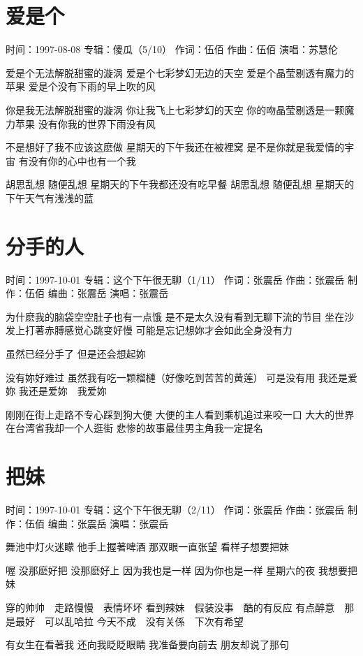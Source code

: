 \documentclass[UTF8,a4paper,oneside,twocolumn,12pt]{ctexbook}
\newcommand{\infopair}[2]{\textbullet #1：#2}
\newcommand{\zc}[1][伍佰]{\infopair{作词}{#1}}
\newcommand{\zq}[1][伍佰]{\infopair{作曲}{#1}}
\newcommand{\bq}[1][伍佰]{\infopair{编曲}{#1}}
\newcommand{\zj}[1]{\infopair{专辑}{#1}}
\newcommand{\zz}[1]{\infopair{制作}{#1}}
\newcommand{\sj}[1]{\infopair{时间}{#1}}
\newenvironment{info}{\begin{flushleft}\kaishu
	}
	{\end{flushleft}\normalsize\yahei\par}
\newenvironment{lyric}{
	}
{}
\begin{document}
\section{爱是个}
\begin{info}
	\sj{1997-08-08}
	\zj{傻瓜（5/10）}
	\zc
	\zq
	\infopair{演唱}{苏慧伦}
\end{info}
\begin{lyric}
	爱是个无法解脱甜蜜的漩涡
	爱是个七彩梦幻无边的天空
	爱是个晶莹剔透有魔力的苹果
	爱是个没有下雨的早上吹的风

	你是我无法解脱甜蜜的漩涡
	你让我飞上七彩梦幻的天空
	你的吻晶莹剔透是一颗魔力苹果
	没有你我的世界下雨没有风

	不是想好了我不应该这麽做
	星期天的下午我还在被裡窝
	是不是你就是我爱情的宇宙
	有没有你的心中也有一个我

	胡思乱想 随便乱想 星期天的下午我都还没有吃早餐
	胡思乱想 随便乱想 星期天的下午天气有浅浅的蓝
\end{lyric}

\section{分手的人}
\begin{info}
	\sj{1997-10-01}
	\zj{这个下午很无聊（1/11）}
	\zc[张震岳]
	\zq[张震岳]
	\zz{伍佰}
	\bq[张震岳]
	\infopair{演唱}{张震岳}
\end{info}
\begin{lyric}
	为什麽我的脑袋空空肚子也有一点饿
	是不是太久没有看到无聊下流的节目
	坐在沙发上打著赤膊感觉心跳变好慢
	可能是忘记想妳才会如此全身没有力

	虽然已经分手了 但是还会想起妳

	没有妳好难过
	虽然我有吃一颗榴槤（好像吃到苦苦的黄莲）
	可是没有用 我还是爱妳
	我还是爱妳　我爱妳

	刚刚在街上走路不专心踩到狗大便
	大便的主人看到乘机追过来咬一口
	大大的世界在台湾省我却一个人逛街
	悲惨的故事最佳男主角我一定提名
\end{lyric}

\section{把妹}
\begin{info}
	\sj{1997-10-01}
	\zj{这个下午很无聊（2/11）}
	\zc[张震岳]
	\zq[张震岳]
	\zz{伍佰}
	\bq[张震岳]
	\infopair{演唱}{张震岳}
\end{info}
\begin{lyric}
	舞池中灯火迷矇 他手上握著啤酒
	那双眼一直张望 看样子想要把妹

	喔 没那麽好把 没那麽好上
	因为我也是一样 因为你也是一样
	星期六的夜 我想要把妹

	穿的帅帅　走路慢慢　表情坏坏
	看到辣妹　假装没事　酷的有反应
	有点醉意　那是最好　可以乱哈拉
	今天不成　没有关係　下次有希望

	有女生在看著我 还向我眨眨眼睛
	我准备要向前去 朋友却说了那句
\end{lyric}
\end{document}
